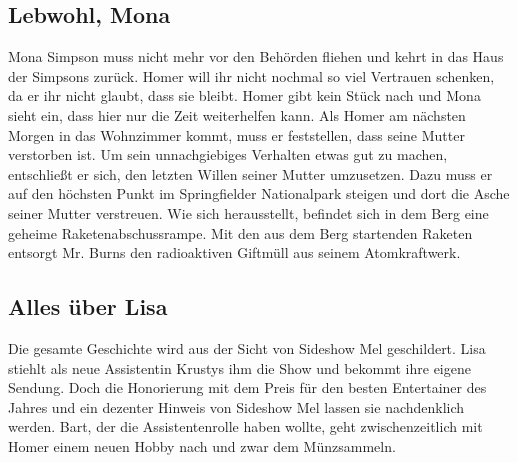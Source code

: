 

\subsection{Lebwohl, Mona}\label{KABF12}
Mona Simpson muss nicht mehr vor den Behörden fliehen und kehrt in das Haus der Simpsons zurück. Homer will ihr nicht nochmal so viel Vertrauen schenken, da er ihr nicht glaubt, dass sie bleibt. Homer gibt kein Stück nach und Mona sieht ein, dass hier nur die Zeit weiterhelfen kann. Als Homer am nächsten Morgen in das Wohnzimmer kommt, muss er feststellen, dass seine Mutter verstorben ist. Um sein unnachgiebiges Verhalten etwas gut zu machen, entschließt er sich, den letzten Willen seiner Mutter umzusetzen. Dazu muss er auf den höchsten Punkt im Springfielder Nationalpark steigen und dort die Asche seiner Mutter verstreuen. Wie sich herausstellt, befindet sich in dem Berg eine geheime Raketenabschussrampe. Mit den aus dem Berg startenden Raketen entsorgt Mr. Burns den radioaktiven Giftmüll aus seinem Atomkraftwerk. 



\subsection{Alles über Lisa}\label{KABF13}
Die gesamte Geschichte wird aus der Sicht von Sideshow Mel geschildert. Lisa stiehlt als neue Assistentin Krustys ihm die Show und bekommt ihre eigene Sendung. Doch die Honorierung mit dem Preis für den besten Entertainer des Jahres und ein dezenter Hinweis von Sideshow Mel lassen sie nachdenklich werden. Bart, der die Assistentenrolle haben wollte, geht zwischenzeitlich mit Homer einem neuen Hobby nach und zwar dem Münzsammeln.

